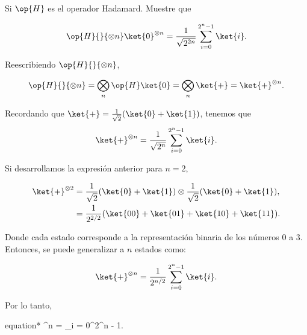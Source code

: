 \documentclass[./../main.tex]{subfiles}
\begin{document}
\begin{problema}
	Si \(\op{H}\) es el operador Hadamard. Muestre que

	\begin{equation*}
		\op{H}{}{\otimes n}\ket{0}^{\otimes n} = \dfrac{1}{\sqrt{2^{2n}}}\sum_{i = 0}^{2^{n} - 1}\ket{i}.
	\end{equation*}

	\startsolution

	Reescribiendo \(\op{H}{}{\otimes n}\),

	\begin{equation*}
		\op{H}{}{\otimes n} = \bigotimes_{n} \op{H}\ket{0} = \bigotimes_{n} \ket{+} = \ket{+}^{\otimes n}.
	\end{equation*}

	Recordando que \(\ket{+} = \tfrac{1}{\sqrt{2}}(\ket{0} + \ket{1})\), tenemos que
	\begin{equation}
		\ket{+}^{\otimes n} = \dfrac{1}{\sqrt{2^{n}}}\sum_{i = 0}^{2^{n} - 1}\ket{i}.
		\label{eq:tensor_prod-plus_state}
	\end{equation}

	Si desarrollamos la expresión anterior para \(n = 2\),

	\begin{align*}
		\ket{+}^{\otimes 2} & = \dfrac{1}{\sqrt{2}}(\ket{0} + \ket{1}) \otimes \dfrac{1}{\sqrt{2}}(\ket{0} + \ket{1}), \\
		                    & = \dfrac{1}{2^{2 / 2}}(\ket{00} + \ket{01} + \ket{10} + \ket{11}).
	\end{align*}

	Donde cada estado corresponde a la representación binaria de los números \(0\) a \(3\). Entonces,  se puede generalizar a \(n\) estados como:

	\begin{equation*}
		\ket{+}^{\otimes n} = \dfrac{1}{2^{n / 2}}\sum_{i = 0}^{2^{n} - 1}\ket{i}.
	\end{equation*}

	Por lo tanto,

	\begin{empheq}[box=\resultbox]{equation*}
		^{\otimes n} = \sum_{i = 0}^{2^{n} - 1}.
	\end{empheq}

\end{problema}
\end{document}
